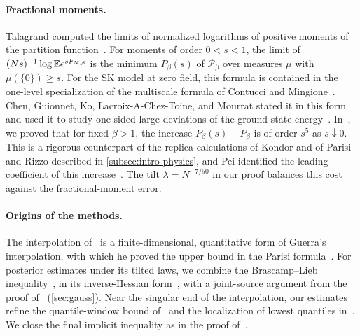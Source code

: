 \paragraph{Fractional moments.}
Talagrand computed the limits of normalized logarithms of positive
moments of the partition function~\cite{Talagrand2007FractionalMoments}. For moments of order
$0<s<1$, the limit of $(Ns)^{-1}\log\mathbb E e^{sF_{N,\beta}}$ is the minimum
$P_\beta(s)$ of $\mathcal P_\beta$ over measures $\mu$ with
$\mu(\{0\})\ge s$. For the SK model at zero field, this formula is
contained in the one-level specialization of the multiscale formula of
Contucci and Mingione~\cite[Theorem~2.1]{ContucciMingione2019}. Chen,
Guionnet, Ko, Lacroix-A-Chez-Toine, and Mourrat stated it in this form
and used it to study one-sided large deviations of the ground-state
energy~\cite[Theorem~2.1]{ChenEtAl2026LargeDeviations}.
In~\cite[Lemma~7.2 and Proposition~7.3]{AL}, we proved that for fixed
$\beta>1$, the increase $P_\beta(s)-P_\beta$ is of order $s^5$ as
$s\downarrow0$. This is a rigorous counterpart of the replica
calculations of Kondor and of Parisi and Rizzo described in
\cref{subsec:intro-physics}, and Pei identified the leading coefficient
of this increase~\cite[Theorem~1(a)]{Pei2026}. The tilt
$\lambda=N^{-7/50}$ in our proof balances this cost against the
fractional-moment error.

\paragraph{Origins of the methods.}
The interpolation of~\cite[Section~2]{AL} is a finite-dimensional,
quantitative form of Guerra's interpolation, with which he proved the
upper bound in the Parisi formula~\cite{Guerra2003}. For posterior
estimates under its tilted laws, we combine the Brascamp--Lieb
inequality~\cite[Theorem~4.1]{BrascampLieb1976}, in its inverse-Hessian
form~\cite[Proposition~2.2]{AL}, with a joint-source argument from the
proof of~\cite[Lemma~2.3]{OpenAIFluctuationScale} (\cref{sec:gauss}).
Near the singular end of the interpolation, our estimates refine the
quantile-window bound of~\cite[Lemma~3.3]{AL} and the localization of
lowest quantiles in~\cite[Lemma~7.6]{AL}. We close the final implicit
inequality as in the proof of~\cite[Proposition~7.7]{AL}.

